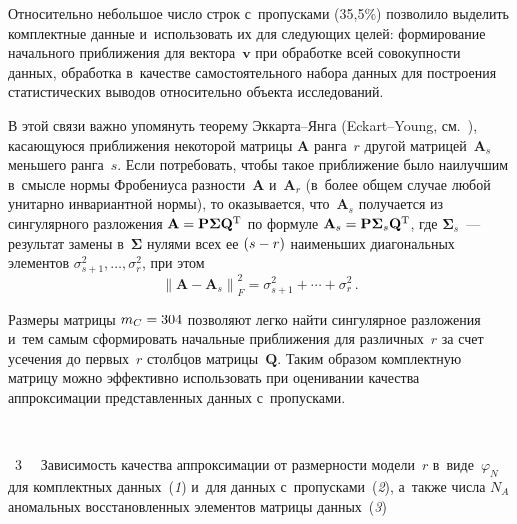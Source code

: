 \begin{multicols}{2}
     Относительно небольшое число строк с~пропусками (35,5\%) позволило 
выделить комплектные данные и~использовать их для следующих целей: 
формирование начального приближения для вектора~$\bm{v}$ при обработке 
всей совокупности данных, обработка в~качестве самостоятельного набора 
данных для построения статистических выводов относительно объекта 
исследований. 
     
     В этой связи важно упомянуть теорему Эк\-кар\-та--Ян\-га  
(Eckart--Young, см.~\cite{6-kri}), касающуюся приближения некоторой матрицы 
$\mathbf{A}$ ранга~$r$ другой матрицей~$\mathbf{A}_s$ меньшего ранга~$s$. 
Если потребовать, чтобы такое приближение было наилучшим в~смыс\-ле нормы 
Фробениуса разности~$\mathbf{A}$ и~$\mathbf{A}_r$ (в~более общем случае 
любой унитарно инвариантной нормы), то оказывается, что~$\mathbf{A}_s$ 
получается из сингулярного разложения $\mathbf{A}\hm= 
\mathbf{P}\bm{\Sigma}\mathbf{Q}^{\mathrm{T}}$ по формуле $\mathbf{A}_s\hm= 
\mathbf{P}\bm{\Sigma}_s\mathbf{Q}^{\mathrm{T}}$, где $\bm{\Sigma}_s$~--- результат 
замены в~$\bm{\Sigma}$ нулями всех ее $(s\hm-r)$ наименьших диагональных 
элементов $\sigma^2_{s+1}, \ldots , \sigma^2_r$, при этом 
     $$
     \left\| \mathbf{A} -\mathbf{A}_s\right\|^2_F =\sigma^2_{s+1} + \cdots + 
\sigma^2_r\,.
     $$
     
     Размеры матрицы $m_C\hm= 304$ позволяют легко найти сингулярное 
разложения и~тем самым сформировать начальные приближения для 
различных~$r$ за счет усечения до первых~$r$ столб\-цов  
мат\-ри\-цы~$\mathbf{Q}$. Таким образом комплектную матрицу можно 
эффективно использовать при оценивании качества аппроксимации 
представленных данных с~пропусками. 

{ \begin{center}  %
 \vspace*{-6pt}
    \mbox{%
\epsfxsize=79.335mm
}

\end{center}

\vspace*{-3pt}

\noindent
{{\figurename~3}\ \ \small{
Зависимость качества аппроксимации от размерности модели~$r$ в~виде~$\varphi_N$ для комплектных данных~(\textit{1})
и~для данных 
с~пропусками~(\textit{2}), а~также чис\-ла $N_A$ аномальных восстановленных элементов мат\-ри\-цы 
данных~(\textit{3}) 
}}}

\vspace*{9pt}



\end{multicols}
